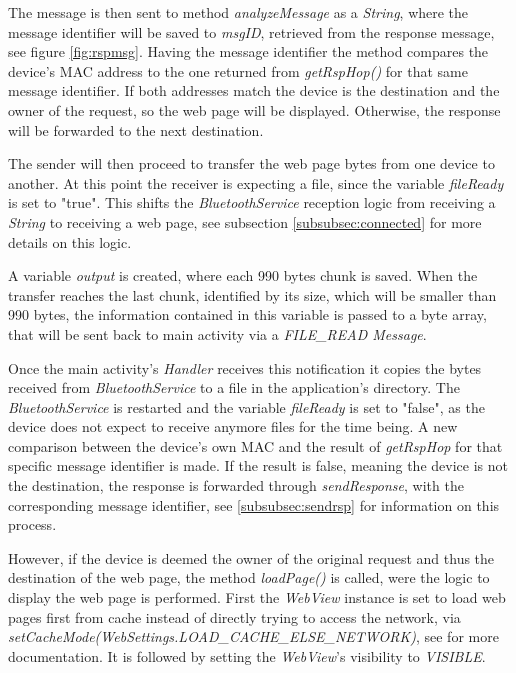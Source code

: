 The message is then sent to method \textit{analyzeMessage} as a \textit{String}, where the message identifier will be saved to \textit{msgID}, retrieved from the response message, see figure \ref{fig:rspmsg}. Having the message identifier the method compares the device's \gls{MAC} address to the one returned from \textit{getRspHop()} for that same message identifier. If both addresses match the device is the destination and the owner of the request, so the web page will be displayed. Otherwise, the response will be forwarded to the next destination.

The sender will then proceed to transfer the web page bytes from one device to another. At this point the receiver is expecting a file, since the variable \textit{fileReady} is set to "true". This shifts the \textit{BluetoothService} reception logic from receiving a \textit{String} to receiving a web page, see subsection \ref{subsubsec:connected} for more details on this logic.

A variable \textit{output} is created, where each 990 bytes chunk is saved. When the transfer reaches the last chunk, identified by its size, which will be smaller than 990 bytes, the information contained in this variable is passed to a byte array, that will be sent back to main activity via a \textit{FILE\_READ Message}.

Once the main activity's \textit{Handler} receives this notification it copies the bytes received from \textit{BluetoothService} to a file in the application's directory. The \textit{BluetoothService} is restarted and the variable \textit{fileReady} is set to "false", as the device does not expect to receive anymore files for the time being. A new comparison between the device's own \gls{MAC} and the result of \textit{getRspHop} for that specific message identifier is made. If the result is false, meaning the device is not the destination, the response is forwarded through \textit{sendResponse}, with the corresponding message identifier, see \ref{subsubsec:sendrsp} for information on this process.

However, if the device is deemed the owner of the original request and thus the destination of the web page, the method \textit{loadPage()} is called, were the logic to display the web page is performed. First the \textit{WebView} instance is set to load web pages first from cache instead of directly trying to access the network, via \textit{setCacheMode(WebSettings.LOAD\_CACHE\_ELSE\_NETWORK)}, see \cite{webview} for more documentation. It is followed by setting the \textit{WebView}'s visibility to \textit{VISIBLE}.


